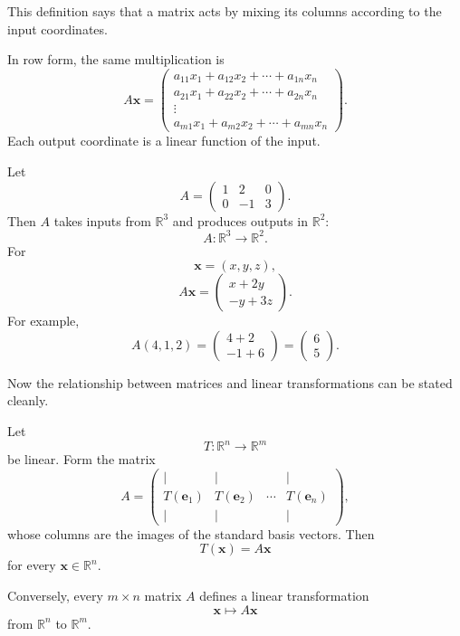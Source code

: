 This definition says that a matrix acts by mixing its columns according to the input
coordinates.

In row form, the same multiplication is
\[
    A\mathbf x
    =
    \begin{pmatrix}
        a_{11}x_1+a_{12}x_2+\cdots+a_{1n}x_n\\
        a_{21}x_1+a_{22}x_2+\cdots+a_{2n}x_n\\
        \vdots\\
        a_{m1}x_1+a_{m2}x_2+\cdots+a_{mn}x_n
    \end{pmatrix}.
\]
Each output coordinate is a linear function of the input.

\begin{example}
Let
\[
    A=
    \begin{pmatrix}
        1&2&0\\
        0&-1&3
    \end{pmatrix}.
\]
Then \(A\) takes inputs from \(\mathbb R^3\) and produces outputs in \(\mathbb R^2\):
\[
    A:\mathbb R^3\to\mathbb R^2.
\]
For
\[
    \mathbf x=(x,y,z),
\]
\[
    A\mathbf x
    =
    \begin{pmatrix}
        x+2y\\
        -y+3z
    \end{pmatrix}.
\]
For example,
\[
    A(4,1,2)
    =
    \begin{pmatrix}
        4+2\\
        -1+6
    \end{pmatrix}
    =
    \begin{pmatrix}
        6\\
        5
    \end{pmatrix}.
\]
\end{example}

Now the relationship between matrices and linear transformations can be stated cleanly.

\begin{theorem}
Let
\[
    T:\mathbb R^n\to\mathbb R^m
\]
be linear.  Form the matrix
\[
    A=
    \begin{pmatrix}
        |&|&&|\\
        T(\mathbf e_1)&T(\mathbf e_2)&\cdots&T(\mathbf e_n)\\
        |&|&&|
    \end{pmatrix},
\]
whose columns are the images of the standard basis vectors.  Then
\[
\boxed{
    T(\mathbf x)=A\mathbf x
}
\]
for every \(\mathbf x\in\mathbb R^n\).

Conversely, every \(m\times n\) matrix \(A\) defines a linear transformation
\[
    \mathbf x\longmapsto A\mathbf x
\]
from \(\mathbb R^n\) to \(\mathbb R^m\).
\end{theorem}

